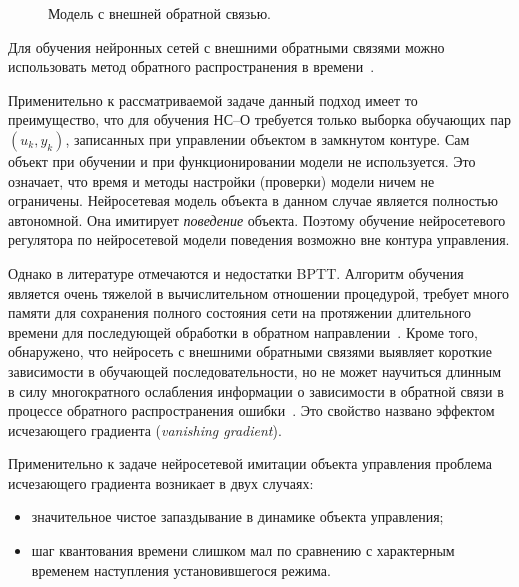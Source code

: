\begin{figure}[h]
  \centering
  
  \caption{Модель с внешней обратной связью.}
  \label{fig:nnp-feedback}
\end{figure}

Для обучения нейронных сетей с внешними обратными связями можно
использовать метод обратного распространения в
времени~\cite{gibb96,sigom00}.

Применительно к рассматриваемой задаче данный подход имеет то
преимущество, что для обучения НС--О требуется только выборка
обучающих пар $(u_k, y_k)$, записанных при управлении объектом в
замкнутом контуре.  Сам объект при обучении и при функционировании
модели не используется.  Это означает, что время и методы настройки
(проверки) модели ничем не ограничены.  Нейросетевая модель объекта в
данном случае является полностью автономной.  Она имитирует {\it
поведение }объекта.  Поэтому обучение нейросетевого регулятора по
нейросетевой модели поведения возможно вне контура управления.

Однако в литературе отмечаются и недостатки BPTT.  Алгоритм обучения
является очень тяжелой в вычислительном отношении процедурой, требует
много памяти для сохранения полного состояния сети на протяжении
длительного времени для последующей обработки в обратном
направлении~\cite{levinar95}.  Кроме того, обнаружено, что нейросеть с
внешними обратными связями выявляет короткие зависимости в обучающей
последовательности, но не может научиться длинным в силу многократного
ослабления информации о зависимости в обратной связи в процессе
обратного распространения ошибки~\cite{linetal}.  Это свойство названо
эффектом исчезающего градиента ({\em vanishing gradient}).

Применительно к задаче нейросетевой имитации объекта управления
проблема исчезающего градиента возникает в двух случаях:
\begin{itemize}\label{simple-feedback-defects}
  \item значительное чистое запаздывание в динамике объекта
  управления;
  \item шаг квантования времени слишком мал по сравнению с
  характерным временем наступления установившегося режима.
\end{itemize}


